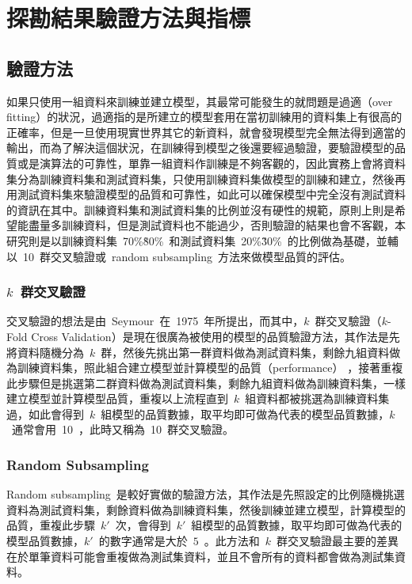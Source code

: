 \section{探勘結果驗證方法與指標}

\subsection{驗證方法}

如果只使用一組資料來訓練並建立模型，其最常可能發生的就問題是過適（over fitting）的狀況，過適指的是所建立的模型套用在當初訓練用的資料集上有很高的正確率，但是一旦使用現實世界其它的新資料，就會發現模型完全無法得到適當的輸出，而為了解決這個狀況，在訓練得到模型之後還要經過驗證，要驗證模型的品質或是演算法的可靠性，單靠一組資料作訓練是不夠客觀的，因此實務上會將資料集分為訓練資料集和測試資料集，只使用訓練資料集做模型的訓練和建立，然後再用測試資料集來驗證模型的品質和可靠性，如此可以確保模型中完全沒有測試資料的資訊在其中。訓練資料集和測試資料集的比例並沒有硬性的規範，原則上則是希望能盡量多訓練資料，但是測試資料也不能過少，否則驗證的結果也會不客觀，本研究則是以訓練資料集~70\%\~80\%~和測試資料集~20\%\~30\%~的比例做為基礎，並輔以~10~群交叉驗證或~random subsampling~方法來做模型品質的評估。

\subsubsection{$k$~群交叉驗證}

交叉驗證的想法是由~Seymour\cite{geisser1975predictive}~在~1975~年所提出，而其中，$k$~群交叉驗證（$k$-Fold Cross Validation）是現在很廣為被使用的模型的品質驗證方法，其作法是先將資料隨機分為~$k$~群，然後先挑出第一群資料做為測試資料集，剩餘九組資料做為訓練資料集，照此組合建立模型並計算模型的品質（performance） ，接著重複此步驟但是挑選第二群資料做為測試資料集，剩餘九組資料做為訓練資料集，一樣建立模型並計算模型品質，重複以上流程直到~$k$~組資料都被挑選為訓練資料集過，如此會得到~$k$~組模型的品質數據，取平均即可做為代表的模型品質數據，$k$~通常會用~10~，此時又稱為~10~群交叉驗證。


\subsubsection{Random Subsampling}

Random subsampling~是較好實做的驗證方法，其作法是先照設定的比例隨機挑選資料為測試資料集，剩餘資料做為訓練資料集，然後訓練並建立模型，計算模型的品質，重複此步驟~$k'$~次，會得到~$k'$~組模型的品質數據，取平均即可做為代表的模型品質數據，$k'$~的數字通常是大於~$5$~。此方法和~$k$~群交叉驗證最主要的差異在於單筆資料可能會重複做為測試集資料，並且不會所有的資料都會做為測試集資料。

